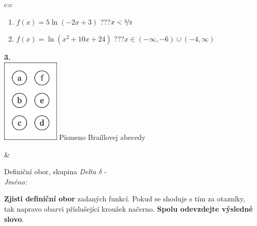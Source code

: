 \documentclass[10pt]{report}
\begin{document}
\begin{tabular}{c:c}
\begin{minipage}[c][104.5mm][t]{0.5\linewidth}
\begin{center}
\begin{minipage}{0.79\linewidth}
\begin{center}
\begin{varwidth}{\linewidth}
\begin{enumerate}
\item $f(x)=5\ln{(-2x+3)}$\quad \dotfill\; ???\;\dotfill \quad $x<\nicefrac{3}{2}$
\item $f(x)=\ln{(x^2+10x+24)}$\quad \dotfill\; ???\;\dotfill \quad $x\in(-\infty , -6)\cup(-4 , \infty)$
\end{enumerate}
\end{varwidth}
\end{center}
\end{minipage}
\begin{minipage}{0.20\linewidth}
\begin{center}
{\Huge\bfseries 3.} \\[2mm]
\includegraphics[height=40mm]{../images/braille.png}
{\small Písmeno Braillovej abecedy}
\end{center}
\end{minipage}
\end{center}
\end{minipage}
&
\begin{minipage}[c][104.5mm][t]{0.5\linewidth}
\begin{center}
\vspace{7mm}
{\huge Definiční obor, skupina \textit{Delta $\delta$} -}\\[5mm]
\textit{Jméno:}\phantom{xxxxxxxxxxxxxxxxxxxxxxxxxxxxxxxxxxxxxxxxxxxxxxxxxxxxxxxxxxxxxxxxx}\\[5mm]
\begin{minipage}{0.95\linewidth}
\begin{center}
\textbf{Zjisti definiční obor} zadaných funkcí. Pokud se shoduje s tím za otazníky,\\tak napravo obarvi příslušející kroužek načerno. \textbf{Spolu odevzdejte výsledné slovo}.
\end{center}
\end{minipage}
\\[1mm]
\begin{minipage}{0.79\linewidth}
\begin{center}
\begin{varwidth}{\linewidth}
\begin{enumerate}

\end{enumerate}
\end{varwidth}
\end{center}
\end{minipage}
\end{center}
\end{minipage}
\end{tabular}
\end{document}
